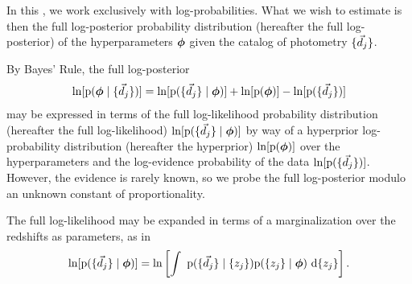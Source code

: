 In this \paper, we work exclusively with log-probabilities.  
What we wish to estimate is then the full log-posterior probability distribution (hereafter the full log-posterior) of the hyperparameters ${\boldsymbol{\phi}}$ given the catalog of photometry $\{\vec{d}_{j}\}$.

By Bayes' Rule, the full log-posterior
\begin{equation}
\eqlabel{eq:basicbayes}
\ln[\pr{\ndphi \gvn \{\data_{j}\}}] = \ln[\pr{\{\data_{j}\} \gvn \ndphi}] + \ln[\pr{\ndphi}] - \ln[\pr{\{\data_{j}\}}]
\end{equation}
may be expressed in terms of the full log-likelihood probability distribution (hereafter the full log-likelihood) $\ln[\mathrm{p}(\{\vec{d}_{j}\} \mid {\ensuremath{\boldsymbol{\phi}}})]$ by way of a hyperprior log-probability distribution (hereafter the hyperprior) $\ln[\mathrm{p}({\boldsymbol{\phi}})]$ over the hyperparameters and the log-evidence probability of the data $\ln[\mathrm{p}(\{\vec{d}_{j}\})]$.
However, the evidence is rarely known, so we probe the full log-posterior modulo an unknown constant of proportionality.

The full log-likelihood may be expanded in terms of a marginalization over the redshifts as parameters, as in 
\begin{equation}
\eqlabel{eq:marginalize}
\ln[\pr{\{\data_{j}\} \gvn \ndphi}] = \ln\left[\integral{\pr{\{\data_{j}\} \gvn \{z_{j}\}} \pr{\{z_{j}\} \gvn \ndphi}}{\{z_{j}\}}\right].
\end{equation}

